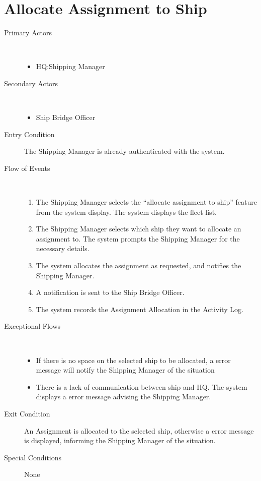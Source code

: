 \documentclass[a4paper,10pt]{report}
\begin{document}
\section{Allocate Assignment to Ship}
\begin{description}
\item[Primary Actors] \
  \begin{itemize}
    \item HQ:Shipping Manager
  \end{itemize}
\item[Secondary Actors] \
  \begin{itemize}
    \item Ship Bridge Officer
  \end{itemize}
\item[Entry Condition]
  The Shipping Manager is already authenticated with the system.
\item[Flow of Events] \
  \begin{enumerate}
    \item The Shipping Manager selects the ``allocate assignment to ship'' feature from the system display. The system displays the fleet list.
    \item The Shipping Manager selects which ship they want to allocate an assignment to. The system prompts the Shipping Manager for the necessary details.
    \item The system allocates the assignment as requested, and notifies the Shipping Manager.
    \item A notification is sent to the Ship Bridge Officer.
    \item The system records the Assignment Allocation in the Activity Log.
  \end{enumerate}
\item[Exceptional Flows] \
  \begin{itemize}
   \item If there is no space on the selected ship to be allocated, a error message will notify the Shipping Manager of the situation
   \item There is a lack of communication between ship and HQ. The system displays a error message advising the Shipping Manager.
  \end{itemize}
\item[Exit Condition]
  An Assignment is allocated to the selected ship, otherwise a error message is displayed, informing the Shipping Manager of the situation.
\item[Special Conditions] None
\end{description}
\end{document}
